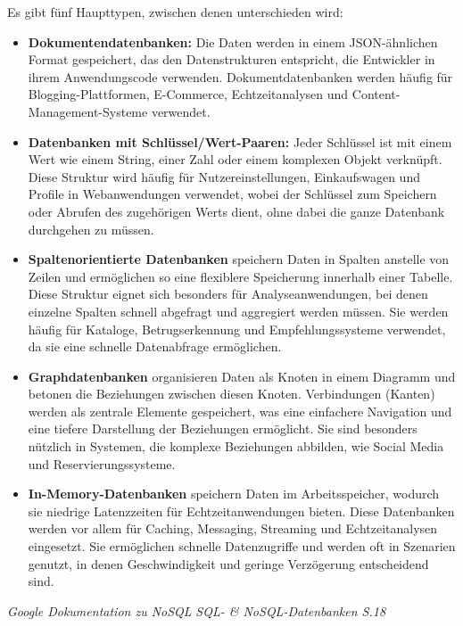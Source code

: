 \vspace{3mm}\noindent Es gibt fünf Haupttypen, zwischen denen unterschieden wird:
\vspace{3mm}\begin{itemize}
    \item \textbf{Dokumentendatenbanken:} Die Daten werden in einem JSON-ähnlichen Format gespeichert, das den Datenstrukturen entspricht, die Entwickler in ihrem Anwendungscode verwenden. Dokumentdatenbanken werden häufig für Blogging-Plattformen, E-Commerce, Echtzeitanalysen und Content-Management-Systeme verwendet.
    
    \item \textbf{Datenbanken mit Schlüssel/Wert-Paaren:} Jeder Schlüssel ist mit einem Wert wie einem String, einer Zahl oder einem komplexen Objekt verknüpft. Diese Struktur wird häufig für Nutzereinstellungen, Einkaufswagen und Profile in Webanwendungen verwendet, wobei der Schlüssel zum Speichern oder Abrufen des zugehörigen Werts dient, ohne dabei die ganze Datenbank durchgehen zu müssen.
    
    \item \textbf{Spaltenorientierte Datenbanken} speichern Daten in Spalten anstelle von Zeilen und ermöglichen so eine flexiblere Speicherung innerhalb einer Tabelle. Diese Struktur eignet sich besonders für Analyseanwendungen, bei denen einzelne Spalten schnell abgefragt und aggregiert werden müssen. Sie werden häufig für Kataloge, Betrugserkennung und Empfehlungssysteme verwendet, da sie eine schnelle Datenabfrage ermöglichen.
    
    \item \textbf{Graphdatenbanken} organisieren Daten als Knoten in einem Diagramm und betonen die Beziehungen zwischen diesen Knoten. Verbindungen (Kanten) werden als zentrale Elemente gespeichert, was eine einfachere Navigation und eine tiefere Darstellung der Beziehungen ermöglicht. Sie sind besonders nützlich in Systemen, die komplexe Beziehungen abbilden, wie Social Media und Reservierungssysteme.
    
    \item \textbf{In-Memory-Datenbanken} speichern Daten im Arbeitsspeicher, wodurch sie niedrige Latenzzeiten für Echtzeitanwendungen bieten. Diese Datenbanken werden vor allem für Caching, Messaging, Streaming und Echtzeitanalysen eingesetzt. Sie ermöglichen schnelle Datenzugriffe und werden oft in Szenarien genutzt, in denen Geschwindigkeit und geringe Verzögerung entscheidend sind.
    
\end{itemize}
\cite{Google:NoSQL} \textit{Google Dokumentation zu NoSQL} \newline
\cite{Buch:AndreasMaier} \textit{SQL- \& NoSQL-Datenbanken S.18}
\newpage
